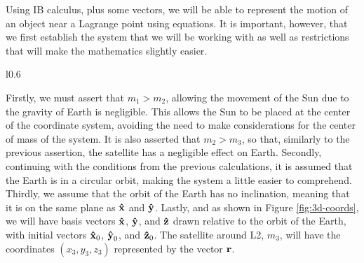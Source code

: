 Using IB calculus, plus some vectors, we will be able to represent the motion of an object near a Lagrange point using equations.
It is important, however, that we first establish the system that we will be working with as well as restrictions that will make the mathematics slightly easier.
\begin{wrapfigure}{l}{0.6\textwidth}
	\centering
	\vspace*{0.25cm}
	\caption{three-dimensional diagram of the Sun-Earth system with unit vectors relative to the Earth's orbit. Not drawn to scale.}
	\label{fig:3d-coords}
\end{wrapfigure}
Firstly, we must assert that $m_1 > m_2$, allowing the movement of the Sun due to the gravity of Earth is negligible.
This allows the Sun to be placed at the center of the coordinate system, avoiding the need to make considerations for the center of mass of the system.
It is also asserted that $m_2 > m_3$, so that, similarly to the previous assertion, the satellite has a negligible effect on Earth.
Secondly, continuing with the conditions from the previous calculations, it is assumed that the Earth is in a circular orbit, making the system a little easier to comprehend.
Thirdly, we assume that the orbit of the Earth has no inclination, meaning that it is on the same plane as $\uvec{x}$ and $\uvec{y}$.
Lastly, and as shown in Figure \ref{fig:3d-coords}, we will have basis vectors $\uvec{x}$, $\uvec{y}$, and $\uvec{z}$ drawn relative to the orbit of the Earth, with initial vectors $\uvec{x}_0$, $\uvec{y}_0$, and $\uvec{z}_0$.
The satellite around L2, $m_3$, will have the coordinates $(x_3,y_3,z_3)$ represented by the vector $\bm{\mathbf{r}}$.


